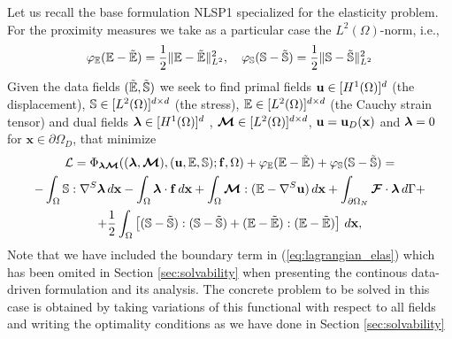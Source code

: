 Let us recall the base formulation NLSP1 specialized for 
the elasticity problem. For the proximity measures we take as a particular
case the $L^2(\Omega)$-norm, i.e.,
$$
\varphi_{\mathbb{E}}(\mathbb{E} - \tilde{\mathbb{E}}) = \frac{1}{2}\|\mathbb{E}-\tilde{\mathbb{E}}\|^2_{L^2},~~~
\varphi_{\mathbb{S}}(\mathbb{S} - \tilde{\mathbb{S}}) = \frac{1}{2}\|\mathbb{S}-\tilde{\mathbb{S}}\|^2_{L^2}
$$
Given the data fields $(\tilde{\mathbb{E}}, \tilde{\mathbb{S}})$ we seek to
find primal fields
$\mathbf{u} \in [H^1(\Omega)]^d$ (the displacement), $\mathbb{S} \in [L^2(\Omega)]^{d\times d}$ (the stress),
$\mathbb{E} \in [L^2(\Omega)]^{d \times d}$ (the Cauchy strain tensor)
and dual fields $\boldsymbol{\lambda} \in [H^1(\Omega)]^d$ , $\boldsymbol{\mathcal{M}} \in [L^2(\Omega)]^{d \times d}$,
$\mathbf{u} = \mathbf{u}_D(\mathbf{x})$ and $\boldsymbol{\lambda} = 0$ for $\mathbf{x} \in \partial{\Omega}_D$,
that minimize
\begin{multline}
\mathcal{L} = \Phi_{\boldsymbol{\lambda} \boldsymbol{\mathcal{M}}}((\boldsymbol{\lambda}, \boldsymbol{\mathcal{M}}), (\mathbf{u}, \mathbb{E}, \mathbb{S}); \mathbf{f}, \Omega) +
\varphi_{\mathbb{E}}(\mathbb{E} - \tilde{\mathbb{E}}) + \varphi_{\mathbb{S}}(\mathbb{S} - \tilde{\mathbb{S}}) =  \\
- \int_{\Omega} \mathbb{S} : \nabla^S \boldsymbol{\lambda} \, d\mathbf{x} - \int_{\Omega} \boldsymbol{\lambda} \cdot \mathbf{f} \, d\mathbf{x} + \int_{\Omega} \boldsymbol{\mathcal{M}} : (\mathbb{E} -  \nabla^S \mathbf{u})\,d\mathbf{x} + \int_{\partial{\Omega}_N} {\boldsymbol{\mathcal{F}}\cdot \boldsymbol{\lambda}}\,d\Gamma + \\
+ \frac{1}{2} \int_{\Omega} \left[ (\mathbb{S} - \tilde{\mathbb{S}}) : (\mathbb{S} - \tilde{\mathbb{S}}) + (\mathbb{E} - \tilde{\mathbb{E}}) : (\mathbb{E} - \tilde{\mathbb{E}}) \right] \, d\mathbf{x},\label{eq:lagrangian_elas}
\end{multline}
Note that we have included the boundary term in (\ref{eq:lagrangian_elas}) which
has been omited in Section \ref{sec:solvability}
when presenting the continous data-driven formulation and its analysis. 
The concrete problem to be solved in this case is obtained
by taking variations of this functional with respect to all fields
and writing the optimality conditions as we have done in Section \ref{sec:solvability}
